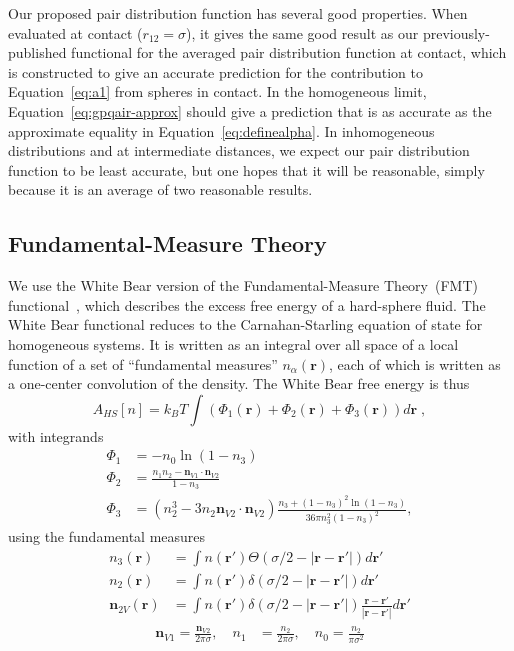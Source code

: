 \documentclass[letterpaper,twocolumn,amsmath,amssymb,pre,aps,10pt]{revtex4-1}
\newcommand{\rr}{\textbf{r}}
\begin{document}
Our proposed pair distribution function has several good properties.
When evaluated at contact ($r_{12}=\sigma$), it gives the same good
result as our previously-published functional for the averaged pair
distribution function at contact, which is constructed to give an
accurate prediction for the contribution to Equation~\ref{eq:a1} from
spheres in contact.  In the homogeneous limit,
Equation~\ref{eq:gpqair-approx} should give a prediction that is as
accurate as the approximate equality in
Equation~\ref{eq:definealpha}.  In inhomogeneous distributions and at
intermediate distances, we expect our pair distribution function to be
least accurate, but one hopes that it will be reasonable, simply
because it is an average of two reasonable results.


\subsection*{Fundamental-Measure Theory}

We use the White Bear version of the Fundamental-Measure Theory~(FMT)
functional~\cite{roth2002whitebear}, which describes the excess free
energy of a hard-sphere fluid.  The White Bear functional reduces to
the Carnahan-Starling equation of state for homogeneous systems.  It
is written as an integral over all space of a local function of a set
of ``fundamental measures'' $n_\alpha(\rr)$, each of which is written
as a one-center convolution of the density.  The White Bear free
energy is thus
\begin{equation}
A_{\textit{HS}}[n] = k_B T \int \left(\Phi_1(\rr) + \Phi_2(\rr) + \Phi_3(\rr)\right) d\rr \; ,
\end{equation}
with integrands
\begin{align}
\Phi_1 &= -n_0 \ln\left( 1 - n_3\right) \label{eq:Phi1}\\
\Phi_2 &= \frac{n_1 n_2 - \mathbf{n}_{V1} \cdot\mathbf{n}_{V2}}{1-n_3} \\
\Phi_3 &= (n_2^3 - 3 n_2 \mathbf{n}_{V2} \cdot \mathbf{n}_{V2}) \frac{
  n_3 + (1-n_3)^2 \ln(1-n_3)
}{
  36\pi n_3^2\left( 1 - n_3 \right)^2
} , \label{eq:Phi3}
\end{align}
using the fundamental measures
\begin{align}
  n_3(\rr) &= \int n(\rr') \Theta(\sigma/2 -\left|\rr - \rr'\right|)
  d\rr' \label{eq:FMn3} \\
  n_2(\rr) &= \int n(\rr') \delta(\sigma/2 -\left|\rr - \rr'\right|) d\rr' \\
  \mathbf{n}_{2V}(\rr) &= \int n(\rr') \delta(\sigma/2 -\left|\rr - \rr'\right|) \frac{\rr-\rr'}{|\rr-\rr'|}d\rr'
\end{align}
\begin{align}
  \mathbf{n}_{V1} = \frac{\mathbf{n}_{V2}}{2\pi \sigma}, \quad
  n_1 &= \frac{n_2}{2\pi \sigma} , \quad
  n_0 = \frac{n_2}{\pi \sigma^2} \label{eq:FMrest}
\end{align}
\end{document}
